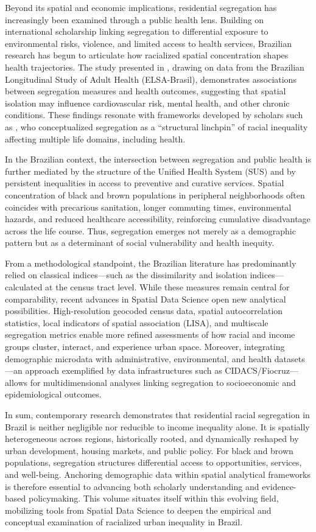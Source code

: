 \documentclass[12pt,a4paper]{article}
\begin{document}
Beyond its spatial and economic implications, residential segregation has increasingly been examined through a public health lens. Building on international scholarship linking segregation to differential exposure to environmental risks, violence, and limited access to health services, Brazilian research has begun to articulate how racialized spatial concentration shapes health trajectories. The study presented in \cite{barber2018cardioelsa}, drawing on data from the Brazilian Longitudinal Study of Adult Health (ELSA-Brasil), demonstrates associations between segregation measures and health outcomes, suggesting that spatial isolation may influence cardiovascular risk, mental health, and other chronic conditions. These findings resonate with frameworks developed by scholars such as \cite{massey1988dimensions}, who conceptualized segregation as a “structural linchpin” of racial inequality affecting multiple life domains, including health.

In the Brazilian context, the intersection between segregation and public health is further mediated by the structure of the Unified Health System (SUS) and by persistent inequalities in access to preventive and curative services. Spatial concentration of black and brown populations in peripheral neighborhoods often coincides with precarious sanitation, longer commuting times, environmental hazards, and reduced healthcare accessibility, reinforcing cumulative disadvantage across the life course. Thus, segregation emerges not merely as a demographic pattern but as a determinant of social vulnerability and health inequity.

From a methodological standpoint, the Brazilian literature has predominantly relied on classical indices—such as the dissimilarity and isolation indices—calculated at the census tract level. While these measures remain central for comparability, recent advances in Spatial Data Science open new analytical possibilities. High-resolution geocoded census data, spatial autocorrelation statistics, local indicators of spatial association (LISA), and multiscale segregation metrics enable more refined assessments of how racial and income groups cluster, interact, and experience urban space. Moreover, integrating demographic microdata with administrative, environmental, and health datasets—an approach exemplified by data infrastructures such as CIDACS/Fiocruz—allows for multidimensional analyses linking segregation to socioeconomic and epidemiological outcomes.

In sum, contemporary research demonstrates that residential racial segregation in Brazil is neither negligible nor reducible to income inequality alone. It is spatially heterogeneous across regions, historically rooted, and dynamically reshaped by urban development, housing markets, and public policy. For black and brown populations, segregation structures differential access to opportunities, services, and well-being. Anchoring demographic data within spatial analytical frameworks is therefore essential to advancing both scholarly understanding and evidence-based policymaking. This volume situates itself within this evolving field, mobilizing tools from Spatial Data Science to deepen the empirical and conceptual examination of racialized urban inequality in Brazil.
\end{document}
